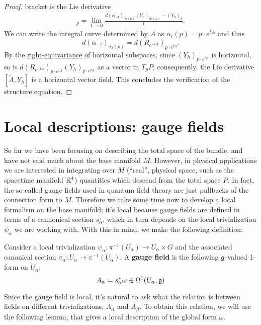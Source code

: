 \begin{proof}
    bracket is the Lie derivative
    \begin{align*}
        [\tilde A, Y_h]_p=\lim_{t\to 0}\frac{d(\alpha_{-t})_{\alpha_t(p)}(Y_h)_{\alpha_t(p)}-(Y_h)_p}{t}.
    \end{align*}
    We can write the integral curve determined by $A$ as $\alpha_t(p)=p\cdot e^{tA}$ and thus
    \[d(\alpha_{-t})_{\alpha_t(p)}=d(R_{e^{-tA}})_{p\cdot e^{tA}}.\]
    By the \hyperref[defn:conn]{right-equivariance} of horizontal subspaces, since $(Y_h)_{p\cdot e^{tA}}$ is horizontal,
    so is $d(R_{e^{-tA}})_{p\cdot e^{tA}}(Y_h)_{p\cdot e^{tA}}$ as a vector in $T_pP$; consequently, the Lie derivative $[\tilde A,Y_h]$ is a
    horizontal vector field. This concludes the verification of the structure equation.
\end{proof}




\section{Local descriptions: gauge fields}
So far we have been focusing on describing the total space of the bundle, and have not said much about the base manifold $M$. However, in physical applications we are interested in integrating over $M$ (``real'', physical space, such as the spacetime manifold $\mathbb{R}^4$) quantities which descend from the total space $P$. In fact, the so-called gauge fields used in quantum field theory are just pullbacks of the connection form to $M$. Therefore we take some time now to develop a local formalism on the base manifold; it's local because gauge fields are defined in terms of a cannonical section $s_{\alpha}$, which in turn depends on the local trivialization $\psi_{\alpha}$ we are working with. With this in mind, we make the following definition:

\begin{defn}
Consider a local trivialization $\psi_{\alpha}: \pi^{-1}(U_{\alpha}) \to U_{\alpha} \times G$ and the associated canonical section $\sigma_{\alpha} : U_{\alpha} \to \pi^{-1}(U_{\alpha})$. A \textbf{gauge field} is the following $\mathfrak g$-valued 1-form on $U_{\alpha}$:
\[      A_{\alpha} = s_{\alpha}^* \omega  \in \Omega^1(U_{\alpha}, \mathfrak g)   \]
\end{defn}

Since the gauge field is local, it's natural to ask what the relation is between fields on different trivializations, $A_{\alpha}$ and $A_{\beta}$. To obtain this relation, we will use the following lemma, that gives a local description of the global form $\omega$.

